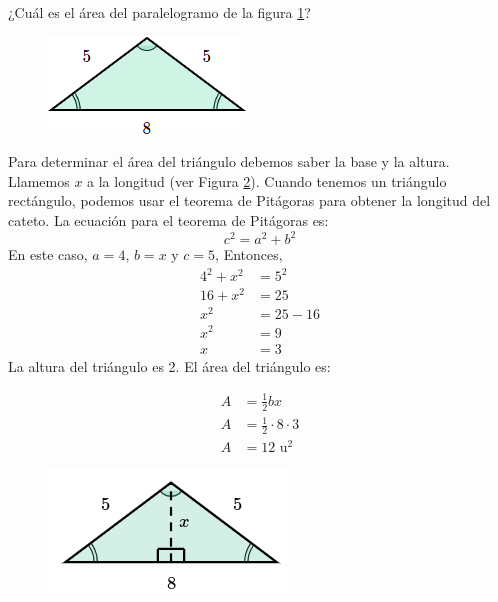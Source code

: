 ¿Cuál es el \'area del paralelogramo de la figura \ref{fig:area_isoseles_03}?

\begin{figure}[H]
    \begin{center}
        \includegraphics[width=0.3\linewidth]{../images/area_isoseles_03.png}
    \end{center}
    \caption{}
    \label{fig:area_isoseles_03}
\end{figure}
\begin{solutionbox}{14cm}

    \begin{minipage}{0.6\textwidth}
        Para determinar el área del triángulo debemos saber la base y la altura. Llamemos $x$ a la longitud (ver Figura \ref{fig:area_isoseles_03a}).
        Cuando tenemos un triángulo rectángulo, podemos usar el teorema de Pitágoras para obtener la longitud del cateto.
        La ecuación para el teorema de Pitágoras es:
        \[c^2=a^2+b^2\]
        En este caso, $a=4$, $b=x$ y $c=5$, Entonces,
        \begin{align*}
            4^2+x^2 & =5^2   \\
            16+x^2  & =25    \\
            x^2     & =25-16 \\
            x^2     & =9     \\
            x       & =3
        \end{align*}
        La altura del triángulo es 2. El área del triángulo es:

        \begin{align*}
            A & =\frac{1}{2}bx             \\
            A & =\frac{1}{2}\cdot 8\cdot 3 \\
            A & =12 \text{ u}^2
        \end{align*}
    \end{minipage}\hfill
    \begin{minipage}{0.35\textwidth}
        \begin{figure}[H]
            \centering
            \includegraphics[width=0.5\linewidth]{../images/area_isoseles_03a.png}
            \caption{}
            \label{fig:area_isoseles_03a}
        \end{figure}
    \end{minipage}

\end{solutionbox}

